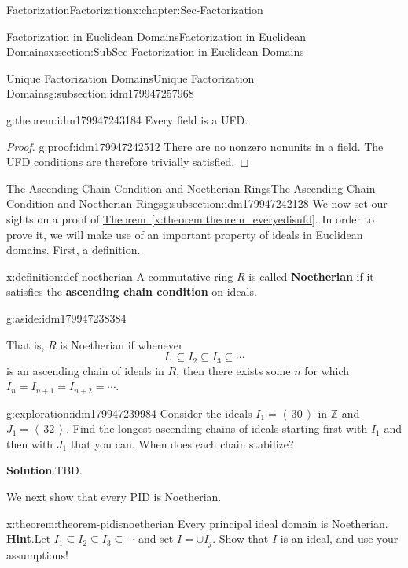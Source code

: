\documentclass[oneside,10pt,]{book}
\newcommand{\blocktitlefont}{\relax}
\newcommand{\xreffont}{\relax}
\newcommand{\terminology}[1]{\textbf{#1}}
\numberwithin{equation}{section}
\newcommand{\ideal}[1]{\left\langle\, #1 \,\right\rangle}
\def\Z{{\mathbb Z}}
\begin{document}
\begin{chapterptx}{Factorization}{}{Factorization}{}{}{x:chapter:Sec-Factorization}
\begin{sectionptx}{Factorization in Euclidean Domains}{}{Factorization in Euclidean Domains}{}{}{x:section:SubSec-Factorization-in-Euclidean-Domains}
\begin{subsectionptx}{Unique Factorization Domains}{}{Unique Factorization Domains}{}{}{g:subsection:idm179947257968}
\begin{theorem}{}{}{g:theorem:idm179947243184}%
Every field is a UFD.%
\end{theorem}
\begin{proof}{}{g:proof:idm179947242512}
There are no nonzero nonunits in a field. The UFD conditions are therefore trivially satisfied.\end{proof}
\end{subsectionptx}
%
%
\typeout{************************************************}
\typeout{************************************************}
%
\begin{subsectionptx}{The Ascending Chain Condition and Noetherian Rings}{}{The Ascending Chain Condition and Noetherian Rings}{}{}{g:subsection:idm179947242128}
We now set our sights on a proof of \hyperref[x:theorem:theorem_everyedisufd]{Theorem~{\xreffont\ref{x:theorem:theorem_everyedisufd}}}. In order to prove it, we will make use of an important property of ideals in Euclidean domains. First, a definition.%
\begin{definition}{}{x:definition:def-noetherian}%
A commutative ring \(R\) is called \terminology{Noetherian} if it satisfies the \terminology{ascending chain condition} on ideals. \begin{aside}{}{g:aside:idm179947238384}%
\end{aside}
 That is, \(R\) is Noetherian if whenever%
\begin{equation*}
I_1 \subseteq I_2\subseteq I_3\subseteq \cdots
\end{equation*}
is an ascending chain of ideals in \(R\), then there exists some \(n\) for which \(I_n = I_{n+1} = I_{n+2} = \cdots\).%
\end{definition}
\begin{exploration}{}{g:exploration:idm179947239984}%
Consider the ideals \(I_1 = \ideal{30}\) in \(\Z\) and \(J_1 = \ideal{32}\). Find the longest ascending chains of ideals starting first with \(I_1\) and then with \(J_1\) that you can. When does each chain stabilize?%
\par\smallskip%
\noindent\textbf{\blocktitlefont Solution}.\hypertarget{g:solution:idm179947234176}{}\quad{}TBD.\end{exploration}
We next show that every PID is Noetherian.%
\begin{theorem}{}{}{x:theorem:theorem-pidisnoetherian}%
Every principal ideal domain is Noetherian.%
\textbf{\blocktitlefont Hint}.\quad{}Let \(I_1\subseteq I_2\subseteq I_3 \subseteq \cdots\) and set \(I = \cup I_j\). Show that \(I\) is an ideal, and use your assumptions!%

\end{theorem}
\end{subsectionptx}
\end{sectionptx}
\end{chapterptx}
\end{document}
